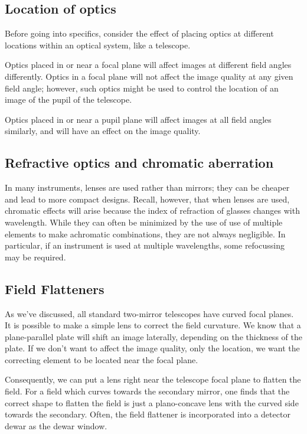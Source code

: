 \documentclass[12pt]{article}
\begin{document}
\subsection*{Location of optics}

Before going into specifics, consider the effect of placing optics at
different locations within an optical system, like a telescope.

Optics placed in or near a focal plane will affect images at different
field angles differently. Optics in a focal plane will not affect the
image quality at any given field angle; however, such optics might be
used to control the location of an image of the pupil of the
telescope.

Optics placed in or near a pupil plane will affect images at all field
angles similarly, and will have an effect on the image quality.

\subsection*{Refractive optics and chromatic aberration}
In many instruments, lenses are used rather than mirrors; they can be
cheaper and lead to more compact designs. Recall, however, that when
lenses are used, chromatic effects will arise because the index of
refraction of glasses changes with wavelength. While they can often be
minimized by the use of use of multiple elements to make achromatic
combinations, they are not always negligible. In particular, if an
instrument is used at multiple wavelengths, some refocussing may be
required.

\subsection*{Field Flatteners}
As we've discussed, all standard two-mirror telescopes have curved
focal planes. It is possible to make a simple lens to correct the
field curvature. We know that a plane-parallel plate will shift an
image laterally, depending on the thickness of the plate. If we don't
want to affect the image quality, only the location, we want the
correcting element to be located near the focal plane.

Consequently, we can put a lens right near the telescope focal plane to
flatten the field. For a field which curves towards the secondary
mirror, one finds that the correct shape to flatten the field is just
a plano-concave lens with the curved side towards the secondary.
Often, the field flattener is incorporated into a detector dewar as
the dewar window.
\end{document}
